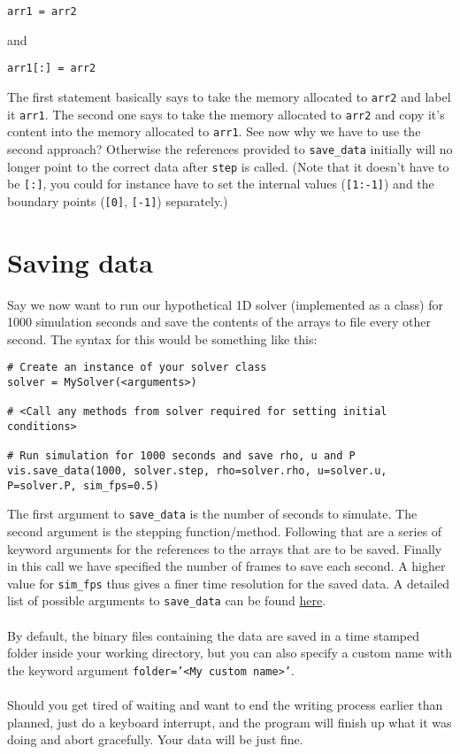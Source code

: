 \documentclass{article}
\newcommand{\ttt}[1]{\texttt{#1}}
\begin{document}
\begin{lstlisting}
arr1 = arr2
\end{lstlisting}
and
\begin{lstlisting}
arr1[:] = arr2
\end{lstlisting}
The first statement basically says to take the memory allocated to \ttt{arr2} and label it \ttt{arr1}. The second one says to take the memory allocated to \ttt{arr2} and copy it's content into the memory allocated to \ttt{arr1}. See now why we have to use the second approach? Otherwise the references provided to \ttt{save\_data} initially will no longer point to the correct data after \ttt{step} is called. (Note that it doesn't have to be \ttt{[:]}, you could for instance have to set the internal values (\ttt{[1:-1]}) and the boundary points (\ttt{[0]}, \ttt{[-1]}) separately.)

\section{Saving data}
\label{sec:save}
Say we now want to run our hypothetical 1D solver (implemented as a class) for 1000 simulation seconds and save the contents of the arrays to file every other second. The syntax for this would be something like this:\\
\begin{minipage}{\linewidth}
\begin{lstlisting}
# Create an instance of your solver class
solver = MySolver(<arguments>)

# <Call any methods from solver required for setting initial conditions>

# Run simulation for 1000 seconds and save rho, u and P
vis.save_data(1000, solver.step, rho=solver.rho, u=solver.u, P=solver.P, sim_fps=0.5)
\end{lstlisting}
\end{minipage}
The first argument to \ttt{save\_data} is the number of seconds to simulate. The second argument is the stepping function/method. Following that are a series of keyword arguments for the references to the arrays that are to be saved. Finally in this call we have specified the number of frames to save each second. A higher value for \ttt{sim\_fps} thus gives a finer time resolution for the saved data. A detailed list of possible arguments to \ttt{save\_data} can be found \hyperref[sec:sd]{here}.\\\\
By default, the binary files containing the data are saved in a time stamped folder inside your working directory, but you can also specify a custom name with the keyword argument \ttt{folder='<My custom name>'}.\\\\
Should you get tired of waiting and want to end the writing process earlier than planned, just do a keyboard interrupt, and the program will finish up what it was doing and abort gracefully. Your data will be just fine.
\end{document}
